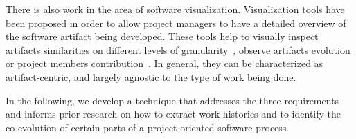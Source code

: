 
There is also work in the area of software visualization. 
Visualization tools have been proposed in order to allow project managers to have a detailed overview of the software artifact being developed. These tools help to visually inspect artifacts similarities on different levels of granularity~\citep{Voinea2006b}, observe artifacts evolution or project members contribution~\citep{Ripley2007,Greene2015}. In general, they can be characterized as artifact-centric, and largely agnostic to the type of work being done.


In the following, we develop a technique that addresses the three requirements and informs prior research on how to extract work histories and to identify the co-evolution of certain parts of a project-oriented software process.



